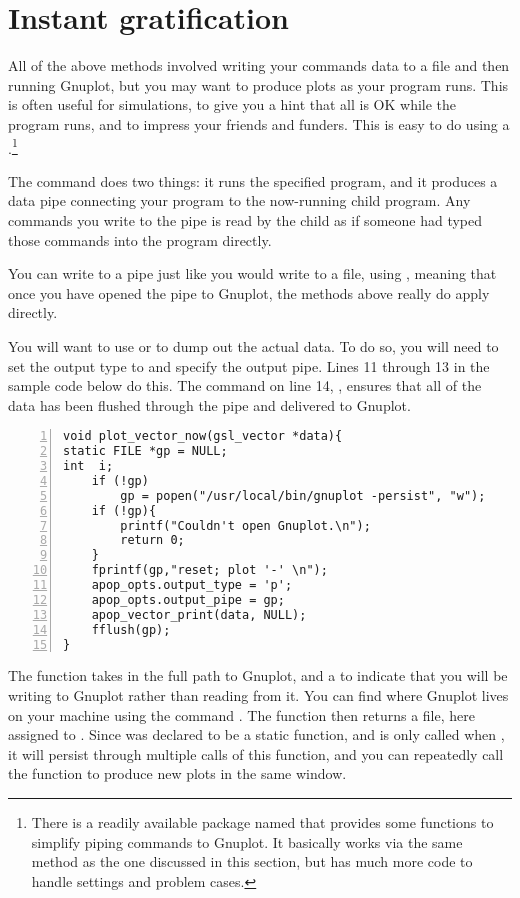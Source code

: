 \section{\treesymbol Instant gratification}
All of the above methods involved writing your commands data to a file and then 
running Gnuplot, but you may want to produce plots as your program runs.
This is often useful for simulations, to give you a hint that all is OK
while the program runs, and to impress your friends and funders. This is
easy to do using a .\footnote{There is a readily available
package named  that provides some functions to simplify
piping commands to Gnuplot. It basically works via the same method as
the one discussed in this section, but has much more code to handle
settings and problem cases.}

The command  does two things: it runs the specified program,
and it produces a data pipe connecting your program to the now-running
child program. Any commands you write to the pipe is read by the child
as if someone had typed those commands into the program directly.

You can write to a pipe just like you would write to a file, using
, meaning that once you have opened the pipe to
Gnuplot, the methods above really do apply directly.

You will want to use  or
 to dump out the actual data. To do so, you
will need to set the output type to  and specify the output
pipe. Lines 11 through 13 in the sample code below do this.
The command on line 14, , ensures that all of the data has
been flushed through the pipe and delivered to Gnuplot.

\label{pipeexample}
\begin{lstlisting}[numbers=left, numberstyle=\scshape]
void plot_vector_now(gsl_vector *data){
static FILE *gp = NULL;
int  i;
    if (!gp)
        gp = popen("/usr/local/bin/gnuplot -persist", "w");
    if (!gp){
        printf("Couldn't open Gnuplot.\n");
        return 0;
    }
    fprintf(gp,"reset; plot '-' \n");
    apop_opts.output_type = 'p';
    apop_opts.output_pipe = gp;
    apop_vector_print(data, NULL);
    fflush(gp);
}
\end{lstlisting} 

The  function takes in the full path to Gnuplot, and a 
to indicate that you will be writing to Gnuplot rather than reading from
it. You can find where Gnuplot lives on your machine using the command
. The  function then returns a file, here
assigned to . Since  was declared to be a static function,
and  is only called when ,
it will persist through multiple calls of this function, and you can
repeatedly call the function to produce new plots in the same window.

